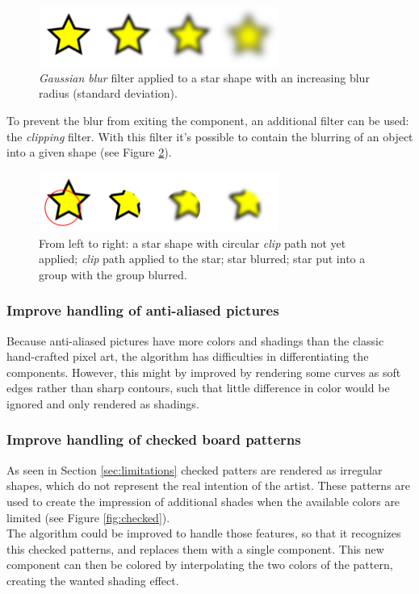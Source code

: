 \documentclass[]{usiinfbachelorproject}
\begin{document}
\begin{figure}[ht]
	\centering
	\includegraphics[width=0.7\textwidth]{img/star_blur.png}
	\caption{\emph{Gaussian blur} filter applied to a star shape with an increasing blur radius (standard deviation).}
	\label{fig:starblur}
\end{figure}

\noindent To prevent the blur from exiting the component, an additional filter can be used: the \emph{clipping} filter. With this filter it's possible to contain the blurring of an object into a given shape (see Figure \ref{fig:clip}).

\begin{figure}[ht]
	\centering
	\includegraphics[width=0.7\textwidth]{img/star_clip.png}
	\caption{From left to right: a star shape with circular \emph{clip} path not yet applied; \emph{clip} path applied to the star; star blurred; star put into a group with the group blurred.}
	\label{fig:clip}
\end{figure}


\subsubsection{Improve handling of anti-aliased pictures}

Because anti-aliased pictures have more colors and shadings than the classic hand-crafted pixel art, the algorithm has difficulties in differentiating the components. However, this might by improved by rendering some curves as soft edges rather than sharp contours, such that little difference in color would be ignored and only rendered as shadings.

\subsubsection{Improve handling of checked board patterns}

As seen in Section \ref{sec:limitations} checked patters are rendered as irregular shapes, which do not represent the real intention of the artist. These patterns are used to create the impression of additional shades when the available colors are limited (see Figure \ref{fig:checked}).\\
The algorithm could be improved to handle those features, so that it recognizes this checked patterns, and replaces them with a single component. This new component can then be colored by interpolating the two colors of the pattern, creating the wanted shading effect.
\end{document}
